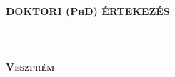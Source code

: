 \null
 \thispagestyle{empty}
 \pagecolor{black!90!white}\afterpage{\nopagecolor}%
     \begin{center}
        \vspace{4cm}
        \textbf{ \textsc{\textcolor{yellow!50!orange}{\LARGE DOKTORI (PhD) ÉRTEKEZÉS}}}\\[4cm]
        \textbf{ \textsc{\textcolor{yellow!50!orange}{\Large \myauthor}}} \\[10cm]
        \textbf{ \textsc{\textcolor{yellow!50!orange}{\large \myuni }}} \\ \textbf{ \textsc{\textcolor{yellow!50!orange}{\large \myschool}}} \\[0.5cm]
        \textbf{ \textsc{\textcolor{yellow!50!orange}{\large Veszprém}}} \\
        \textbf{ \textsc{\textcolor{yellow!50!orange}{\large \mydate }}}
    \end{center}
 \newpage